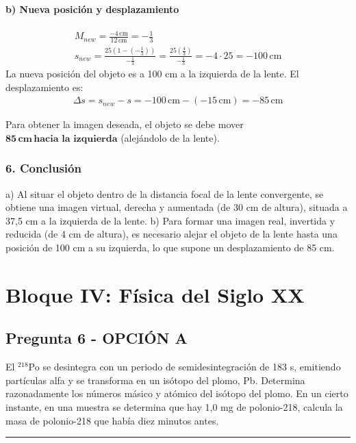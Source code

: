 \paragraph*{b) Nueva posición y desplazamiento}
\begin{gather}
    M_{new} = \frac{-4 \, \text{cm}}{12 \, \text{cm}} = -\frac{1}{3} \\
    s_{new} = \frac{25 \left(1 - (-\frac{1}{3})\right)}{-\frac{1}{3}} = \frac{25 (\frac{4}{3})}{-\frac{1}{3}} = -4 \cdot 25 = -100 \, \text{cm}
\end{gather}
La nueva posición del objeto es a 100 cm a la izquierda de la lente. El desplazamiento es:
\begin{gather}
    \Delta s = s_{new} - s = -100 \, \text{cm} - (-15 \, \text{cm}) = -85 \, \text{cm}
\end{gather}
\begin{cajaresultado}
Para obtener la imagen deseada, el objeto se debe mover $\boldsymbol{85 \, \textbf{cm} \, \textbf{hacia la izquierda}}$ (alejándolo de la lente).
\end{cajaresultado}

\subsubsection*{6. Conclusión}
\begin{cajaconclusion}
a) Al situar el objeto dentro de la distancia focal de la lente convergente, se obtiene una imagen virtual, derecha y aumentada (de 30 cm de altura), situada a 37,5 cm a la izquierda de la lente. b) Para formar una imagen real, invertida y reducida (de 4 cm de altura), es necesario alejar el objeto de la lente hasta una posición de 100 cm a su izquierda, lo que supone un desplazamiento de 85 cm.
\end{cajaconclusion}
\newpage

\section{Bloque IV: Física del Siglo XX}
\label{sec:fisSXX_2025_jun_ord}

\subsection{Pregunta 6 - OPCIÓN A}
\label{subsec:6A_2025_jun_ord}

\begin{cajaenunciado}
El $^{218}$Po se desintegra con un periodo de semidesintegración de 183 s, emitiendo partículas alfa y se transforma en un isótopo del plomo, Pb. Determina razonadamente los números másico y atómico del isótopo del plomo. En un cierto instante, en una muestra se determina que hay 1,0 mg de polonio-218, calcula la masa de polonio-218 que había diez minutos antes.
\end{cajaenunciado}
\hrule


